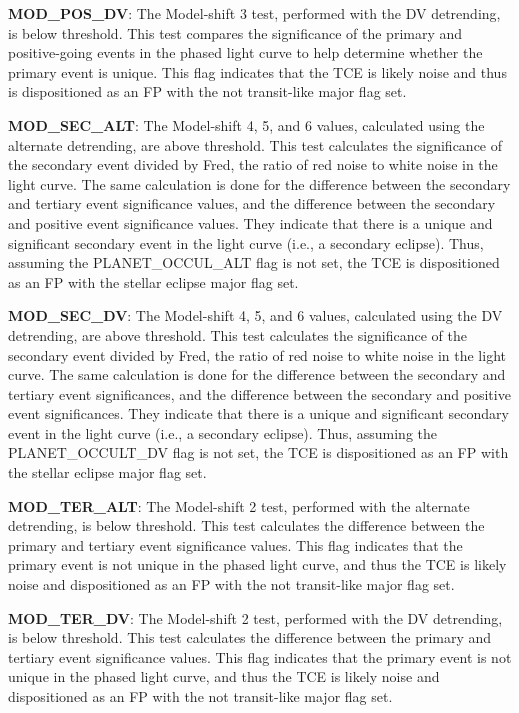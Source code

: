 \textbf{MOD\_POS\_DV}: The Model-shift 3 test, performed with the DV detrending, is below threshold. This test compares the significance of the primary and positive-going events in the phased light curve to help determine whether the primary event is unique. This flag indicates that the TCE is likely noise and thus is dispositioned as an FP with the not transit-like major flag set.

\textbf{MOD\_SEC\_ALT}: The Model-shift 4, 5, and 6 values, calculated using the alternate detrending, are above threshold. This test calculates the significance of the secondary event divided by Fred, the ratio of red noise to white noise in the light curve. The same calculation is done for the difference between the secondary and tertiary event significance values, and the difference between the secondary and positive event significance values. They indicate that there is a unique and significant secondary event in the light curve (i.e., a secondary eclipse). Thus, assuming the PLANET\_OCCUL\_ALT flag is not set, the TCE is dispositioned as an FP with the stellar eclipse major flag set.

\textbf{MOD\_SEC\_DV}: The Model-shift 4, 5, and 6 values, calculated using the DV detrending, are above threshold. This test calculates the significance of the secondary event divided by Fred, the ratio of red noise to white noise in the light curve. The same calculation is done for the difference between the secondary and tertiary event significances, and the difference between the secondary and positive event significances. They indicate that there is a unique and significant secondary event in the light curve (i.e., a secondary eclipse). Thus, assuming the PLANET\_OCCULT\_DV flag is not set, the TCE is dispositioned as an FP with the stellar eclipse major flag set.

\textbf{MOD\_TER\_ALT}: The Model-shift 2 test, performed with the alternate detrending, is below threshold. This test calculates the difference between the primary and tertiary event significance values. This flag indicates that the primary event is not unique in the phased light curve, and thus the TCE is likely noise and dispositioned as an FP with the not transit-like major flag set.

\textbf{MOD\_TER\_DV}: The Model-shift 2 test, performed with the DV detrending, is below threshold. This test calculates the difference between the primary and tertiary event significance values. This flag indicates that the primary event is not unique in the phased light curve, and thus the TCE is likely noise and dispositioned as an FP with the not transit-like major flag set.

